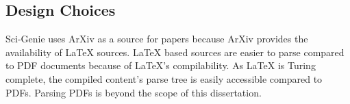 \subsection{Design Choices}
Sci-Genie uses ArXiv as a source for papers because ArXiv provides the availability of LaTeX sources. LaTeX based sources are easier to parse compared to PDF documents because of LaTeX's compilability. As LaTeX is Turing complete, the compiled content’s parse tree is easily accessible compared to PDFs. Parsing PDFs is beyond the scope of this dissertation. 